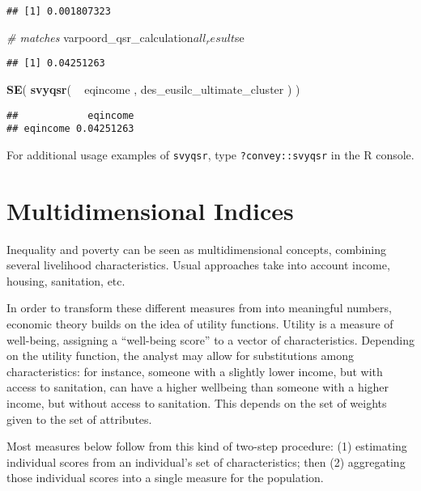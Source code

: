 \documentclass[]{book}
\newenvironment{Shaded}{\begin{snugshade}}{\end{snugshade}}
\newcommand{\KeywordTok}[1]{\textcolor[rgb]{0.13,0.29,0.53}{\textbf{{#1}}}}
\newcommand{\StringTok}[1]{\textcolor[rgb]{0.31,0.60,0.02}{{#1}}}
\newcommand{\CommentTok}[1]{\textcolor[rgb]{0.56,0.35,0.01}{\textit{{#1}}}}
\newcommand{\NormalTok}[1]{{#1}}
\theoremstyle{definition}
\theoremstyle{definition}
\theoremstyle{remark}
\begin{document}
\begin{verbatim}
## [1] 0.001807323
\end{verbatim}

\begin{Shaded}
\begin{Highlighting}[]
\CommentTok{# matches}
\NormalTok{varpoord_qsr_calculation$all_result$se}
\end{Highlighting}
\end{Shaded}

\begin{verbatim}
## [1] 0.04251263
\end{verbatim}

\begin{Shaded}
\begin{Highlighting}[]
\KeywordTok{SE}\NormalTok{( }\KeywordTok{svyqsr}\NormalTok{( ~}\StringTok{ }\NormalTok{eqincome , des_eusilc_ultimate_cluster ) )}
\end{Highlighting}
\end{Shaded}

\begin{verbatim}
##            eqincome
## eqincome 0.04251263
\end{verbatim}

For additional usage examples of \texttt{svyqsr}, type
\texttt{?convey::svyqsr} in the R console.

\chapter{Multidimensional Indices}\label{multidimensional}

Inequality and poverty can be seen as multidimensional concepts,
combining several livelihood characteristics. Usual approaches take into
account income, housing, sanitation, etc.

In order to transform these different measures from into meaningful
numbers, economic theory builds on the idea of utility functions.
Utility is a measure of well-being, assigning a ``well-being score'' to
a vector of characteristics. Depending on the utility function, the
analyst may allow for substitutions among characteristics: for instance,
someone with a slightly lower income, but with access to sanitation, can
have a higher wellbeing than someone with a higher income, but without
access to sanitation. This depends on the set of weights given to the
set of attributes.

Most measures below follow from this kind of two-step procedure: (1)
estimating individual scores from an individual's set of
characteristics; then (2) aggregating those individual scores into a
single measure for the population.
\end{document}
